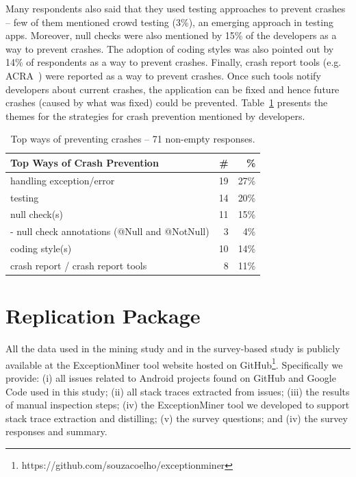 Many respondents also said that they used testing approaches to prevent crashes -- few of them mentioned crowd testing (3\%), an emerging approach in testing apps. Moreover, null checks were also mentioned by 15\% of the developers as a way to prevent crashes. 
The adoption of coding styles was also pointed out by 14\% of respondents as a way to prevent crashes. Finally, crash report tools (e.g. ACRA~\cite{Acra14}) were reported as a way to prevent crashes. Once such tools notify developers about current crashes, the application can be fixed and hence future crashes (caused by what was fixed) could be prevented. Table~\ref{tab:topprevent} presents the themes for the strategies for crash prevention mentioned by developers.	 					
		
\bigskip 


\bigskip 
				
\begin{table}
\scriptsize
\centering
\begin{tabular}{lrr}
\hline
\bfseries{Top Ways of Crash Prevention} & \bfseries{\#} & \bfseries{\%} \\
\hline
handling exception/error  & 19 &	27\% \\
testing &	14 &	20\% \\
null check(s) &	11 &	15\% \\
- null check annotations (@Null and @NotNull)	& 3 & 	4\% \\
coding style(s)	& 10 &	14\% \\
crash report / crash report tools &	8	& 11\% \\
\hline
\end{tabular}
\caption{Top ways of preventing crashes -- 71 non-empty responses. }
\label{tab:topprevent}
\end{table}

\bigskip 


\section{Replication Package}
All the data used in the mining study and in the survey-based study is publicly available at the ExceptionMiner tool website hosted on GitHub\footnote{ https://github.com/souzacoelho/exceptionminer}.
Specifically we provide: (i) all issues related to Android projects found
on GitHub and Google Code used in this study; (ii) all stack traces extracted
from issues; (iii) the results of manual inspection steps; (iv) the
ExceptionMiner tool we developed to support stack trace extraction and distilling; (v) the survey questions; and (iv) the survey responses and summary.

